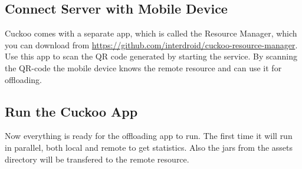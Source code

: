 \documentclass{article}
\begin{document}
\subsection{Connect Server with Mobile Device}
Cuckoo comes with a separate app, which is called the Resource Manager, which
you can download from
\url{https://github.com/interdroid/cuckoo-resource-manager}.
Use this app to scan the QR code generated by starting the service. By scanning
the QR-code the mobile device knows the remote resource and can use it for
offloading.

\subsection{Run the Cuckoo App}
Now everything is ready for the offloading app to run. The first time it will
run in parallel, both local and remote to get statistics. Also the jars from the
assets directory will be transfered to the remote resource.
\end{document}
